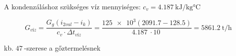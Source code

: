 \vspace{2mm}

\noindent A kondenzáláshoz szükséges víz mennyiséges: $ c_{v} = \SI{4.187}{\kJ\per\kilogram\celsius}$

\vspace{2mm}

\begin{equation}
	G_{\textit{víz}} = \dfrac{{G_{g}}{(i_{\textit{2val}} - i_{k})}} {c_{v} \cdot  \Delta t_{\textit{víz}}} = \dfrac{\SI{125e3} (\SI{2091.7} - \SI{128.5})} {\SI{4.187}{} \cdot \SI{10}{}} = \SI{5861.2}{\tonne\per\hour}
\end{equation}

\vspace{2mm}

kb. $\SI{47}{}$-szerese a gőztermelésnek


